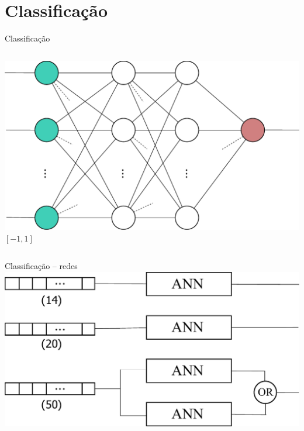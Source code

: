 
\section{Classificação}

\begin{frame}{Classificação}
    \begin{columns}
        \includegraphics[scale=0.5]{figures/neural-network.pdf}
        $[-1,1]$
    \end{columns}
\end{frame}

\begin{frame}{Classificação -- redes}
    \center
    \includegraphics[scale=0.6]{figures/vectors-and-networks.pdf}
\end{frame}
